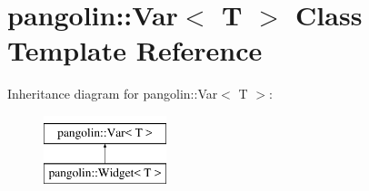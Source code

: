 \hypertarget{classpangolin_1_1_var}{}\section{pangolin\+:\+:Var$<$ T $>$ Class Template Reference}
\label{classpangolin_1_1_var}
Inheritance diagram for pangolin\+:\+:Var$<$ T $>$\+:\begin{figure}[H]
\begin{center}
\leavevmode
\includegraphics[height=2.000000cm]{classpangolin_1_1_var}
\end{center}
\end{figure}
